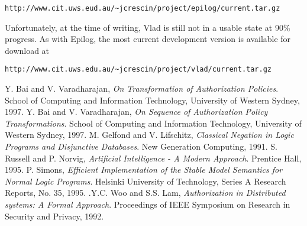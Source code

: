 \documentclass[a4paper]{article}
\begin{document}
    \begin{verbatim}
http://www.cit.uws.eud.au/~jcrescin/project/epilog/current.tar.gz
    \end{verbatim}

    Unfortunately, at the time of writing, Vlad is still not in a usable state
    at 90\% progress. As with Epilog, the most current development version is
    available for download at

    \begin{verbatim}
http://www.cit.uws.edu.au/~jcrescin/project/vlad/current.tar.gz
    \end{verbatim}

  \begin{thebibliography}{}
    Y. Bai and V. Varadharajan, \emph{On Transformation of Authorization Policies}. School of Computing and Information Technology, University of Western Sydney, 1997.
    Y. Bai and V. Varadharajan, \emph{On Sequence of Authorization Policy Transformations}. School of Computing and Information Technology, University of Western Sydney, 1997.
    M. Gelfond and V. Lifschitz, \emph{Classical Negation in Logic Programs and Disjunctive Databases}. New Generation Computing, 1991.
    S. Russell and P. Norvig, \emph{Artificial Intelligence - A Modern Approach}. Prentice Hall, 1995.
    P. Simons, \emph{Efficient Implementation of the Stable Model Semantics for Normal Logic Programs}. Helsinki University of Technology, Series A Research Reports, No. 35, 1995.
    .Y.C. Woo and S.S. Lam, \emph{Authorization in Distributed systems: A Formal Approach}. Proceedings of IEEE Symposium on Research in Security and Privacy, 1992.
  \end{thebibliography}
\end{document}

